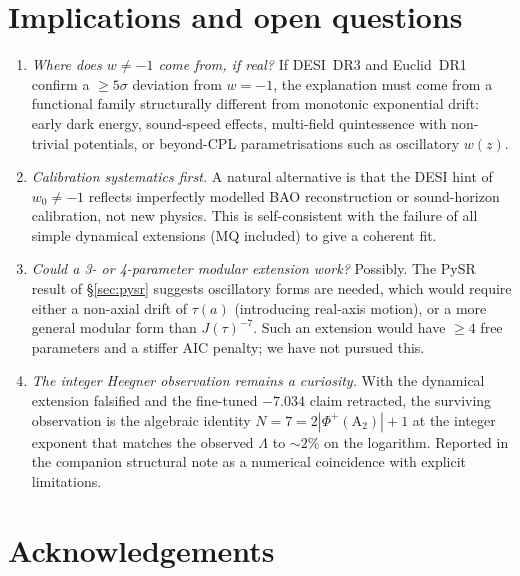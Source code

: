 \documentclass[11pt,letterpaper,twoside]{article}
\begin{document}
\section{Implications and open questions}\label{sec:open}

\begin{enumerate}[leftmargin=*,topsep=0.1em,itemsep=0.1em]
\item \emph{Where does $w\neq-1$ come from, if real?}
      If DESI~DR3 and Euclid~DR1 confirm a $\geq 5\sigma$ deviation from
      $w=-1$, the explanation must come from a functional family structurally
      different from monotonic exponential drift: early dark energy,
      sound-speed effects, multi-field quintessence with non-trivial potentials,
      or beyond-CPL parametrisations such as oscillatory $w(z)$.
\item \emph{Calibration systematics first.} A natural alternative is that the
      DESI hint of $w_{0}\neq-1$ reflects imperfectly modelled BAO reconstruction
      or sound-horizon calibration, not new physics. This is self-consistent
      with the failure of all simple dynamical extensions (MQ included) to
      give a coherent fit.
\item \emph{Could a 3- or 4-parameter modular extension work?}
      Possibly. The PySR result of \S\ref{sec:pysr} suggests oscillatory forms
      are needed, which would require either a non-axial drift of $\tau(a)$
      (introducing real-axis motion), or a more general modular form than
      $J(\tau)^{-7}$. Such an extension would have $\geq 4$ free parameters
      and a stiffer AIC penalty; we have not pursued this.
\item \emph{The integer Heegner observation remains a curiosity.}
      With the dynamical extension falsified and the fine-tuned $-7.034$ claim
      retracted, the surviving observation is the algebraic identity
      $N=7=2|\Phi^{+}(\mathrm{A}_{2})|+1$ at the integer exponent that matches
      the observed $\Lambda$ to $\sim 2\%$ on the logarithm. Reported in the
      companion structural note as a numerical coincidence with explicit
      limitations.
\end{enumerate}

\section*{Acknowledgements}
\end{document}
